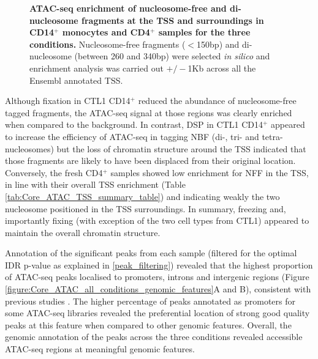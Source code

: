 \begin{figure}[H]
\begin{subfigure}[b]{0.45\textwidth}
\caption{}
\end{subfigure}
\caption[ATAC-seq enrichment of nucleosome-free and di-nucleosome fragments at the TSS and surroundings in CD14$^+$ monocytes and CD4$^+$ samples for the three conditions.]{\textbf{ATAC-seq enrichment of nucleosome-free and di-nucleosome fragments at the TSS and surroundings in CD14$^+$ monocytes and CD4$^+$ samples for the three conditions.} Nucleosome-free fragments ($<$150bp) and di-nucleosome (between 260 and 340bp) were selected \textit{in silico} and enrichment analysis was carried out $+/-$1Kb across all the Ensembl annotated TSS.}
\label{figure:Core_ATAC_intra_dinucleosome_tss_enrichment}
\end{figure}


Although fixation in CTL1 CD14$^+$ reduced the abundance of nucleosome-free tagged fragments, the ATAC-seq signal at those regions was clearly enriched when compared to the background. In contrast, DSP in CTL1 CD14$^+$ appeared to increase the efficiency of ATAC-seq in tagging NBF (di-, tri- and tetra-nucleosomes) but the loss of chromatin structure around the TSS indicated that those fragments are likely to have been displaced from their original location. Conversely, the fresh CD4$^+$ samples showed low enrichment for NFF in the TSS, in line with their overall TSS enrichment (Table \ref{tab:Core_ATAC_TSS_summary_table}) and indicating weakly the two nucleosome positioned in the TSS surroundings. In summary, freezing and, importantly fixing (with exception of the two cell types from CTL1) appeared to maintain the overall chromatin structure.

Annotation of the significant peaks from each sample (filtered for the optimal IDR p-value as explained in \ref{peak_filtering}) revealed that the highest proportion of ATAC-seq peaks localised to promoters, introns and intergenic regions (Figure \ref{figure:Core_ATAC_all_conditions_genomic_features}A and B), consistent with previous studies \parencite{Buenrostro2013,Scharer2016}. The higher percentage of peaks annotated as promoters for some ATAC-seq libraries revealed the preferential location of strong good quality peaks at this feature when compared to other genomic features. Overall, the genomic annotation of the peaks across the three conditions revealed accessible ATAC-seq regions at meaningful genomic features. 

